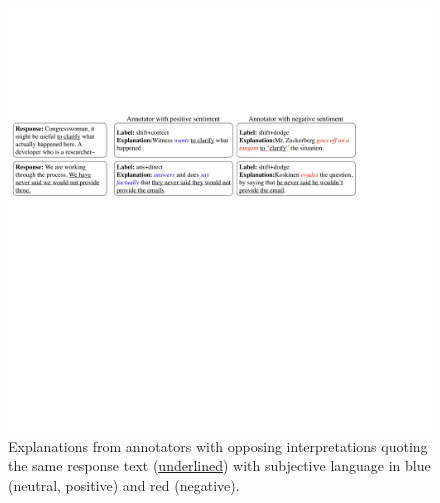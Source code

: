 \begin{figure}
    \centering
    \includegraphics[scale=0.21]{plots/explanation_quotes.pdf}
    \vspace{-2.0em}
    \caption{Explanations from annotators with opposing interpretations quoting the same  response text (\uline{underlined}) with subjective language in {\color{blue}blue} (neutral, positive) and {\color{red}red} (negative).}
    \label{fig:subj_explanations}
\end{figure}

